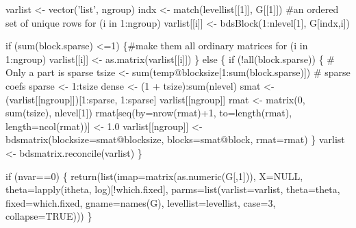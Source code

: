 \documentclass{article}
\begin{document}
varlist <- vector('list', ngroup)
indx <- match(levellist[[1]], G[[1]])  #an ordered set of unique rows
for (i in 1:ngroup) 
    varlist[[i]] <- bdsBlock(1:nlevel[1], G[indx,i])

if (sum(block.sparse) <=1) \{#make them all ordinary matrices
    for (i in 1:ngroup) varlist[[i]] <- as.matrix(varlist[[i]])
    \}
else \{
    if (!all(block.sparse)) \{ # Only a part is sparse
        tsize <- sum(temp@blocksize[1:sum(block.sparse)]) # sparse coefs
        sparse <- 1:tsize
        dense <- (1 + tsize):sum(nlevel)
        smat <- (varlist[[ngroup]])[1:sparse, 1:sparse]
        varlist[[ngroup]]
        rmat <- matrix(0, sum(tsize), nlevel[1])
        rmat[seq(by=nrow(rmat)+1, to=length(rmat), length=ncol(rmat))] <- 1.0
        varlist[[ngroup]] <- bdsmatrix(blocksize=smat@blocksize,
                                       blocks=smat@block, rmat=rmat)
        \} 
    varlist <- bdsmatrix.reconcile(varlist)
    \}

if (nvar==0) \{
    return(list(imap=matrix(as.numeric(G[,1])), X=NULL, 
                theta=lapply(itheta, log)[!which.fixed],
                parms=list(varlist=varlist, theta=theta, 
                           fixed=which.fixed, gname=names(G),
                           levellist=levellist, case=3, collapse=TRUE)))
    \}
\nwendcode{}\nwdocspar
\end{document}
